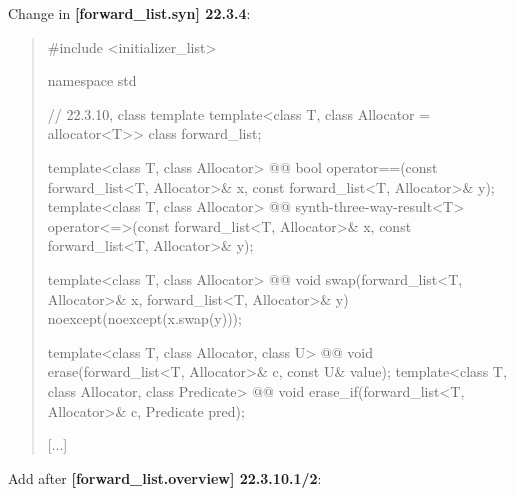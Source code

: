 \documentclass{wg21}
\begin{document}
Change in \textbf{[forward_list.syn] 22.3.4}:
\begin{quote}
\begin{codeblock}
#include <initializer_list>

namespace std {
  // 22.3.10, class template 
  template<class T, class Allocator = allocator<T>> class forward_list;

  template<class T, class Allocator>
    @@ bool operator==(const forward_list<T, Allocator>& x, const forward_list<T, Allocator>& y);
  template<class T, class Allocator>
    @@ synth-three-way-result<T> operator<=>(const forward_list<T, Allocator>& x, const forward_list<T, Allocator>& y);

  template<class T, class Allocator>
    @@ void swap(forward_list<T, Allocator>& x, forward_list<T, Allocator>& y)
      noexcept(noexcept(x.swap(y)));
      
  template<class T, class Allocator, class U>
    @@ void erase(forward_list<T, Allocator>& c, const U& value);
  template<class T, class Allocator, class Predicate>
    @@ void erase_if(forward_list<T, Allocator>& c, Predicate pred);    

  [...]
}
\end{codeblock}
\end{quote}

Add after \textbf{[forward_list.overview] 22.3.10.1/2}:
\begin{quote}
\end{quote}
\end{document}
